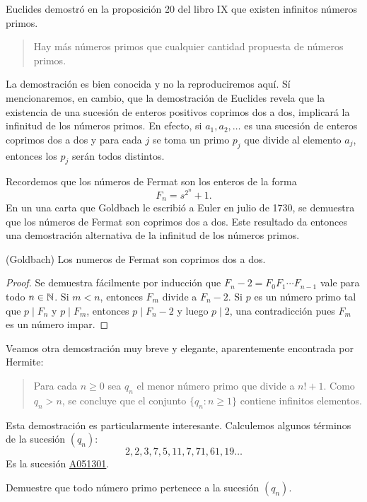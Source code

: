 Euclides demostró en la proposición 20 del libro IX que existen infinitos
números primos. 

\begin{quote}
	Hay más números primos que cualquier cantidad propuesta de números primos.
\end{quote}
La demostración es bien conocida y no la reproduciremos aquí. Sí mencionaremos,
en cambio, que la demostración de Euclides revela que la existencia de una
sucesión de enteros positivos coprimos dos a dos, implicará la infinitud de los
números primos. En efecto, si $a_1,a_2,\dots$ es una sucesión de enteros
coprimos dos a dos y para cada $j$ se toma un primo $p_j$ que divide al
elemento $a_j$, entonces los $p_j$ serán todos distintos.

Recordemos que los números de Fermat son los enteros de la forma
\[
	F_n=s^{2^n}+1.
\]
En un una carta que Goldbach le escribió a Euler en julio de 1730, se demuestra
que los números de Fermat son coprimos dos a dos. Este resultado da entonces
una demostración alternativa de la infinitud de los números primos.

\begin{theorem}(Goldbach)
	Los numeros de Fermat son coprimos dos a dos.
\end{theorem}

\begin{proof}
	Se demuestra fácilmente por inducción que $F_n-2=F_0F_1\cdots F_{n-1}$ vale
	para todo $n\in\mathbb{N}$. Si $m<n$, entonces $F_m$ divide a $F_n-2$. Si $p$ es un
	número primo tal que $p\mid F_n$ y $p\mid F_m$, entonces $p\mid F_n-2$ y
	luego $p\mid 2$, una contradicción pues $F_m$ es un número impar. 
\end{proof}

Veamos otra demostración muy breve y elegante, aparentemente encontrada por Hermite:

\begin{quote}
Para cada $n\geq0$ sea $q_n$ el menor número primo que divide a $n!+1$. Como
$q_n>n$, se concluye que el conjunto $\{q_n:n\geq1\}$ contiene infinitos elementos.
\end{quote}
Esta demostración es particularmente interesante. Calculemos algunos
términos de la sucesión $(q_n)$:
\[
	2,2,3,7,5,11,7,71,61,19\dots
\]
Es la sucesión \href{https://oeis.org/A051301}{A051301}.

\begin{exercise}
	Demuestre que todo número primo pertenece a la sucesión $(q_n)$.
\end{exercise}

